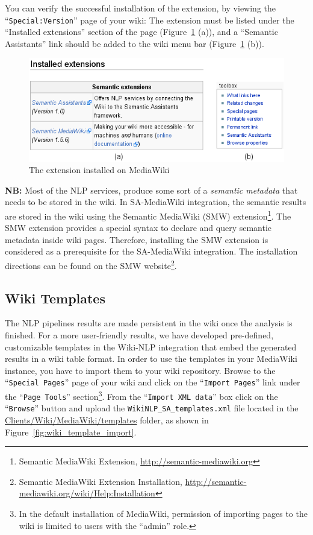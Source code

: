 You can verify the successful installation of the \sa extension, by viewing the ``\texttt{Special:Version}'' page of your wiki: The \sa extension must be listed under the ``Installed extensions'' section of the page (Figure~\ref{fig:semassist_plugin} (a)), and a ``Semantic Assistants'' link should be added to the wiki menu bar (Figure~\ref{fig:semassist_plugin} (b)).

\begin{figure}
\centering
\includegraphics[scale=0.8]{pictures/semassist_plugin.png}
\caption{The \sa extension installed on MediaWiki}
\label{fig:semassist_plugin}
\end{figure}

\blankline
\noindent
\textbf{NB:} Most of the NLP services, produce some sort of a \emph{semantic metadata} that needs to be stored in the wiki. In SA-MediaWiki integration, the semantic results are stored in the wiki using the Semantic MediaWiki (SMW) extension\footnote{Semantic MediaWiki Extension, \url{http://semantic-mediawiki.org}}. The SMW extension provides a special syntax to declare and query semantic metadata inside wiki pages. Therefore, installing the SMW extension is considered as a prerequisite for the SA-MediaWiki integration. The installation directions can be found on the SMW website\footnote{Semantic MediaWiki Extension Installation, \url{http://semantic-mediawiki.org/wiki/Help:Installation}}.

\subsection{Wiki Templates}
The NLP pipelines results are made persistent in the wiki once the analysis is finished. For a more user-friendly results, we have developed pre-defined, customizable templates in the Wiki-NLP integration that embed the generated results in a wiki table format. In order to use the templates in your MediaWiki instance, you have to import them to your wiki repository. Browse to the ``\texttt{Special Pages}'' page of your wiki and click on the ``\texttt{Import Pages}'' link under the ``\texttt{Page Tools}'' section\footnote{In the default installation of MediaWiki, permission of importing pages to the wiki is limited to users with the ``admin'' role.}. From the ``\texttt{Import XML data}'' box click on the ``\texttt{Browse}'' button and upload the \texttt{WikiNLP\_SA\_templates.xml} file located in the \url{Clients/Wiki/MediaWiki/templates} folder, as shown in Figure~\ref{fig:wiki_template_import}.

